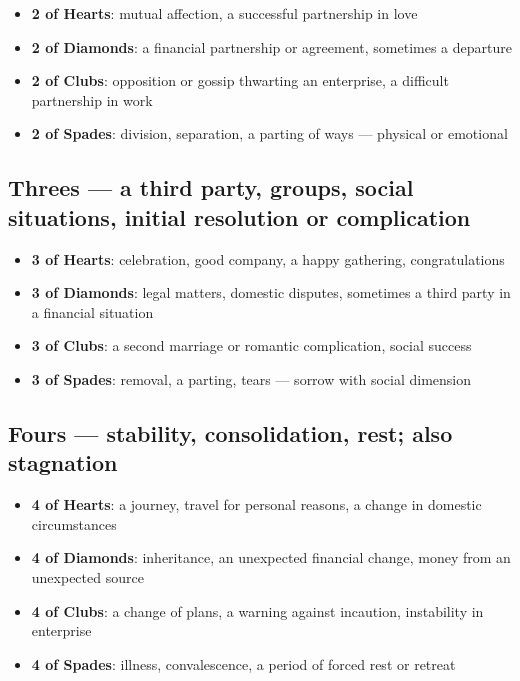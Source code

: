 \begin{itemize}
\tightlist
\item
  \textbf{2 of Hearts}: mutual affection, a successful partnership in love
\item
  \textbf{2 of Diamonds}: a financial partnership or agreement, sometimes a departure
\item
  \textbf{2 of Clubs}: opposition or gossip thwarting an enterprise, a difficult partnership in work
\item
  \textbf{2 of Spades}: division, separation, a parting of ways --- physical or emotional
\end{itemize}

\subsection{Threes --- a third party, groups, social situations, initial resolution or complication}\label{threes--a-third-party-groups-social-situations-initial-resolution-or-complication}

\begin{itemize}
\tightlist
\item
  \textbf{3 of Hearts}: celebration, good company, a happy gathering, congratulations
\item
  \textbf{3 of Diamonds}: legal matters, domestic disputes, sometimes a third party in a financial situation
\item
  \textbf{3 of Clubs}: a second marriage or romantic complication, social success
\item
  \textbf{3 of Spades}: removal, a parting, tears --- sorrow with social dimension
\end{itemize}

\subsection{Fours --- stability, consolidation, rest; also stagnation}\label{fours--stability-consolidation-rest-also-stagnation}

\begin{itemize}
\tightlist
\item
  \textbf{4 of Hearts}: a journey, travel for personal reasons, a change in domestic circumstances
\item
  \textbf{4 of Diamonds}: inheritance, an unexpected financial change, money from an unexpected source
\item
  \textbf{4 of Clubs}: a change of plans, a warning against incaution, instability in enterprise
\item
  \textbf{4 of Spades}: illness, convalescence, a period of forced rest or retreat
\end{itemize}


